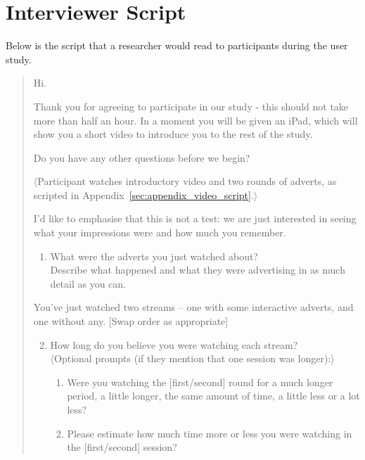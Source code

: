 \section{Interviewer Script}
\label{sec:appendix_interview_script}

Below is the script that a researcher would read to participants during the user study.

\begin{quotation}
	\noindent Hi.

	Thank you for agreeing to participate in our study - this should not take more than half an hour. In a moment you will be given an iPad, which will show you a short video to introduce you to the rest of the study.

	Do you have any other questions before we begin?

	$\langle$Participant watches introductory video and two rounds of adverts, as scripted in Appendix~\ref{sec:appendix_video_script}.$\rangle$

	I'd like to emphasise that this is not a test: we are just interested in seeing what your impressions were and how much you remember.

	\begin{enumerate}
		\item What were the adverts you just watched about? \\
			Describe what happened and what they were advertising in as much detail as you can.
	\end{enumerate}

	You've just watched two streams -- one with some interactive adverts, and one without any. [Swap order as appropriate]

	\begin{enumerate}
	  	\setcounter{enumi}{1}
		\item How long do you believe you were watching each stream?\\
			$\langle$Optional prompts (if they mention that one session was longer):$\rangle$
		\begin{enumerate}[label=\alph*]
			\item Were you watching the [first/second] round for a much longer period, a little longer, the same amount of time, a little less or a lot less?
			\item Please estimate how much time more or less you were watching in the [first/second] session?
		\end{enumerate}


\end{enumerate}
\end{quotation}

